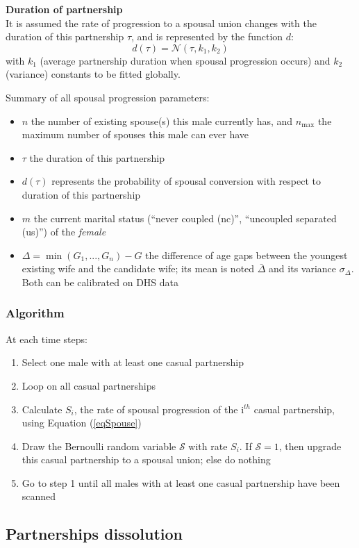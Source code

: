 \documentclass[11pt, onecolumn]{article}
\begin{document}
\textbf{Duration of partnership}\\
It is assumed the rate of progression to a spousal union changes with the duration of this partnership $\tau$, and is represented by the function $d$:
$$d(\tau) =  \mathcal{N}(\tau,k_1,k_2)$$
with $k_1$ (average partnership duration when spousal progression occurs) and $k_2$ (variance) constants to be fitted globally.

Summary of all spousal progression parameters:
\begin{itemize}
\item $n$ the number of existing spouse(s) this male currently has, and $n_{\mathrm{max}}$ the maximum number of spouses this male can ever have
\item $\tau$ the duration of this partnership
\item $d(\tau)$ represents the probability of spousal conversion with respect to duration of this partnership
\item $m$ the current marital status (``never coupled (nc)'', ``uncoupled separated (us)'') of the \emph{female}
\item $\Delta = \min(G_1,...,G_n)-G$ the difference of age gaps between the youngest existing wife and the candidate wife; its mean is noted $\bar{\Delta}$ and its variance $\sigma_\Delta$. Both can be calibrated on DHS data
\end{itemize}

\subsubsection{Algorithm}

At each time steps:
\begin{enumerate} 
\item Select one male with at least one casual partnership
\item Loop on all casual partnerships
\item Calculate $S_i$, the rate of spousal progression of the i$^{th}$ casual partnership, using Equation (\ref{eqSpouse})
\item Draw the Bernoulli random variable $\mathcal{S}$ with rate $S_i$. If $\mathcal{S}=1$, then upgrade this casual partnership to a spousal union; else do nothing
\item Go to step 1 until all males with at least one casual partnership have been scanned
\end{enumerate}



\subsection{Partnerships dissolution}
\end{document}
